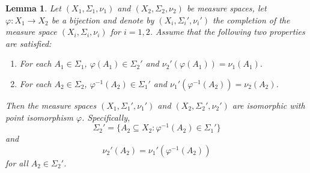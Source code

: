 \documentclass[11pt]{article}
\newtheorem{lemma}[theorem]{Lemma}
\theoremstyle{remark}
\begin{document}
\begin{lemma}\label{lem:PushforwardLemma}
Let $(X_1,\Sigma_1,\nu_1)$ and $(X_2,\Sigma_2,\nu_2)$ be measure spaces, let $\varphi:X_1\to X_2$ be a bijection and denote by $(X_i,\Sigma_i',\nu_i')$ the completion of the measure space $(X_i,\Sigma_i,\nu_i)$ for $i=1,2$. Assume that the following two properties are satisfied:
\begin{enumerate}
\item\label{property:PushforwardLemma1} For each $A_1\in\Sigma_1$, $\varphi(A_1)\in\Sigma_2'$ and $\nu_2'(\varphi(A_1))=\nu_1(A_1).$
\item\label{property:PushforwardLemma2} For each $A_2\in\Sigma_2$, $\varphi^{-1}(A_2)\in \Sigma_1'$ and $\nu_1'(\varphi^{-1}(A_2))=\nu_2(A_2)$.
\end{enumerate}
Then the measure spaces $(X_1,\Sigma_1',\nu_1')$ and $(X_2,\Sigma_2',\nu_2')$ are isomorphic with point isomorphism $\varphi$. Specifically,
\begin{equation}\label{eq:PushforwardLemma1}
\Sigma_2'=\{A_2\subseteq X_2: \varphi^{-1}(A_2)\in\Sigma_1'\}
\end{equation}
and
\begin{equation}\label{eq:PushforwardLemma2}
\nu_2'(A_2)=\nu_1'(\varphi^{-1}(A_2))
\end{equation}
for all $A_2\in\Sigma_2'$.
\end{lemma}
\end{document}
